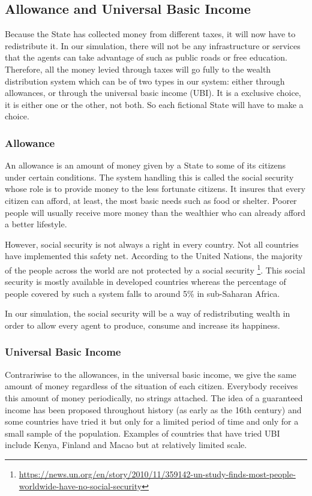 \documentclass[20pt]{article}
\begin{document}
\subsection{Allowance and Universal Basic Income}

Because the State has collected money from different taxes, it will now have to redistribute it. In our simulation, there will not be any infrastructure or services that the agents can take advantage of such as public roads or free education. Therefore, all the money levied through taxes will go fully to the wealth distribution system which can be of two types in our system: either through allowances, or through the universal basic income (UBI). It is a exclusive choice, it is either one or the other, not both. So each fictional State will have to make a choice.

    \subsubsection{Allowance}
    
    An allowance is an amount of money given by a State to some of its citizens under certain conditions. The system handling this is called the social security whose role is to provide money to the less fortunate citizens. It insures that every citizen can afford, at least, the most basic needs such as food or shelter. Poorer people will usually receive more money than the wealthier who can already afford a better lifestyle.
    
    However, social security is not always a right in every country. Not all countries have implemented this safety net. According to the United Nations, the majority of the people across the world are not protected by a social security \footnote{\url{https://news.un.org/en/story/2010/11/359142-un-study-finds-most-people-worldwide-have-no-social-security}}. This social security is mostly available in developed countries whereas the percentage of people covered by such a system falls to around 5\% in sub-Saharan Africa.
    
    In our simulation, the social security will be a way of redistributing wealth in order to allow every agent to produce, consume and increase its happiness.
    
    \subsubsection{Universal Basic Income}
    
    Contrariwise to the allowances, in the universal basic income, we give the same amount of money regardless of the situation of each citizen. Everybody receives this amount of money periodically, no strings attached. The idea of a guaranteed income has been proposed throughout history (as early as the 16th century) and some countries have tried it but only for a limited period of time and only for a small sample of the population. Examples of countries that have tried UBI include Kenya, Finland and Macao but at relatively limited scale. 
    
\end{document}
